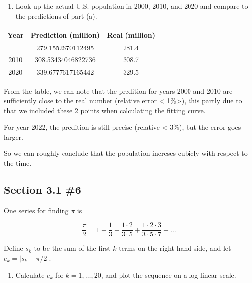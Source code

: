 \documentclass[11pt]{article}
\providecommand{\tightlist}{%
      \setlength{\itemsep}{0pt}\setlength{\parskip}{0pt}}
\begin{document}
    \begin{enumerate}
\def\labelenumi{(\alph{enumi})}
\setcounter{enumi}{1}
\tightlist
\item
  Look up the actual U.S. population in 2000, 2010, and 2020 and compare
  to the predictions of part (a).
\end{enumerate}

    \begin{longtable}[]{@{}ccc@{}}
\toprule\noalign{}
Year & Prediction (million) & Real (million) \\
\midrule\noalign{}
\endhead
\bottomrule\noalign{}
\endlastfoot
2000 & 279.1552670112495 & 281.4 \\
2010 & 308.53434046822736 & 308.7 \\
2020 & 339.6777617165442 & 329.5 \\
\end{longtable}

From the table, we can note that the predition for years 2000 and 2010
are sufficiently close to the real number (relative error \textless{}
1\%\textgreater), this partly due to that we included these 2 points
when calculating the fitting curve.

For year 2022, the predition is still precise (relative \textless{}
3\%), but the error goes larger.

So we can roughly conclude that the population increses cubicly with
respect to the time.

    \hypertarget{section-3.1-6}{%
\subsection{Section 3.1 \#6}\label{section-3.1-6}}

One series for finding \(\pi\) is

\[\frac{\pi}{2} = 1 + \frac{1}{3} + \frac{1\cdot 2}{3\cdot 5} + \frac{1\cdot 2\cdot 3}{3\cdot 5\cdot 7} + \dots\]

Define \(s_k\) to be the sum of the first \(k\) terms on the right-hand
side, and let \(e_k = |s_k - \pi/2|\).

\begin{enumerate}
\def\labelenumi{(\alph{enumi})}
\tightlist
\item
  Calculate \(e_k\) for \(k=1, \dots, 20\), and plot the sequence on a
  log-linear scale.
\end{enumerate}
\end{document}
